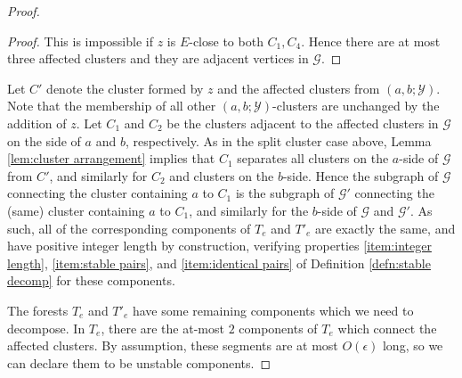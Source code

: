 \documentclass{amsart}
\theoremstyle{definition}
\theoremstyle{remark}
\theoremstyle{definition}
\newcommand{\calG}{\mathcal{G}}
\newcommand{\calY}{\mathcal{Y}}
\begin{document}
\begin{proof}
\begin{proof}
This is impossible if $z$ is $E$-close to both $C_1,C_4$.  Hence there are at most three affected clusters and they are adjacent vertices in $\calG$.
\end{proof}



Let $C'$ denote the cluster formed by $z$ and the affected clusters from $(a,b;\calY)$.  Note that the membership of all other $(a,b;\calY)$-clusters are unchanged by the addition of $z$.  Let $C_1$ and $C_2$ be the clusters adjacent to the affected clusters in $\calG$ on the side of $a$ and $b$, respectively.  As in the split cluster case above, Lemma \ref{lem:cluster arrangement} implies that $C_1$ separates all clusters on the $a$-side of $\calG$ from $C'$, and similarly for $C_2$ and clusters on the $b$-side.  Hence the subgraph of $\calG$ connecting the cluster containing $a$ to $C_1$ is the subgraph of $\calG'$ connecting the (same) cluster containing $a$ to $C_1$, and similarly for the $b$-side of $\calG$ and $\calG'$.  As such, all of the corresponding components of $T_e$ and $T'_e$ are exactly the same, and have positive integer length by construction, verifying properties \eqref{item:integer length}, \eqref{item:stable pairs}, and \eqref{item:identical pairs} of Definition \ref{defn:stable decomp} for these components.

The forests $T_e$ and $T'_e$ have some remaining components which we need to decompose.  In $T_e$, there are the at-most $2$ components of $T_e$ which connect the affected clusters.  By assumption, these segments are at most $O(\epsilon)$ long, so we can declare them to be unstable components.


\end{proof}
\end{document}
